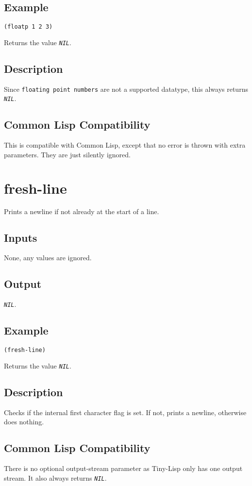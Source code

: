 \documentclass[10pt, openany]{book}
\newcommand{\constant}[1]{\emph{\texttt{#1}}}
\newcommand{\datatype}[1]{\texttt{#1}}
\newcommand{\tl}{Tiny-Lisp}
\newcommand{\cl}{Common Lisp}
\begin{document}
\subsection{Example}
\begin{lstlisting}
(floatp 1 2 3)
\end{lstlisting}
Returns the value \constant{NIL}.
\subsection{Description}
Since \datatype{floating point numbers} are not a supported datatype, this always returns \constant{NIL}.
\subsection{Common Lisp Compatibility}
This is compatible with \cl, except that no error is thrown with extra parameters.  They are just silently ignored.

\section{fresh-line}
Prints a newline if not already at the start of a line.
\subsection{Inputs}
None, any values are ignored.
\subsection{Output}
\constant{NIL}.
\subsection{Example}
\begin{lstlisting}
(fresh-line)
\end{lstlisting}
Returns the value \constant{NIL}.
\subsection{Description}
Checks if the internal first character flag is set.  If not, prints a newline, otherwise does nothing.
\subsection{Common Lisp Compatibility}
There is no optional output-stream parameter as \tl{} only has one output stream.  It also always returns \constant{NIL}.
\end{document}
